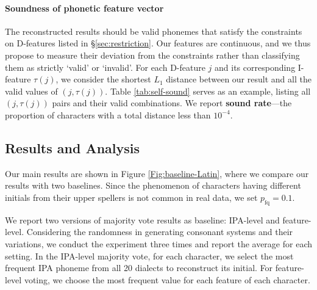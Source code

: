 \paragraph{Soundness of phonetic feature vector} 
The reconstructed results should be valid phonemes that satisfy the constraints on D-features listed in \S\ref{sec:restriction}. 
Our features are continuous, and we thus propose to measure their deviation from the constraints rather than classifying them as strictly `valid' or `invalid'.
For each D-feature $j$ and its corresponding I-feature $\tau(j)$, we consider the shortest $L_1$ distance between our result and all the valid values of $(j, \tau(j))$.
Table \ref{tab:self-sound} serves as an example, listing all $(j, \tau(j))$ pairs and their valid combinations. 
We report \textbf{sound rate}---the proportion of characters with a total distance less than $10^{-4}$.



\subsection{Results and Analysis} \label{sec:synthesis-result-analysis}
Our main results are shown in Figure \ref{Fig:baseline-Latin}, where we compare our results with two baselines. Since the phenomenon of characters having different initials from their upper spellers is not common in real data, we set $p_{\text{fq}}=0.1$.

We report two versions of majority vote results as baseline: IPA-level and feature-level. Considering the randomness in generating consonant systems and their variations, we conduct the experiment three times and report the average for each setting. In the IPA-level majority vote, for each character, we select the most frequent IPA phoneme from all 20 dialects to reconstruct its initial. For feature-level voting, we choose the most frequent value for each feature of each character. 

